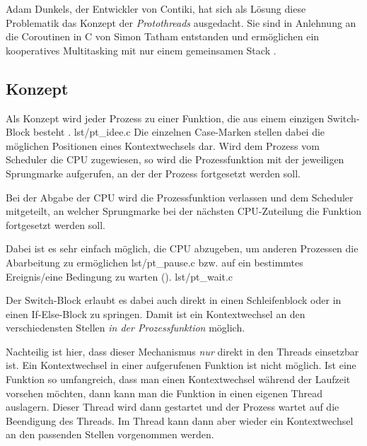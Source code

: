 	Adam Dunkels, der Entwickler von Contiki, hat sich als Lösung diese
	Problematik das Konzept der \emph{Protothreads} ausgedacht.  Sie sind in
	Anlehnung an die Coroutinen in C von Simon Tatham entstanden
	und ermöglichen ein kooperatives Multitasking mit nur einem
	gemeinsamen Stack
	\autocite{Contiki:UnderTheHood}.


\subsection{Konzept}
	Als Konzept wird jeder Prozess zu einer Funktion, die aus einem
	einzigen Switch-Block besteht .
			{lst/pt_idee.c}
	Die einzelnen Case-Marken stellen dabei die möglichen Positionen
	eines Kontextwechsels dar.  Wird dem Prozess vom Scheduler die CPU
	zugewiesen, so wird die Prozessfunktion mit der jeweiligen Sprungmarke
	aufgerufen, an der der Prozess fortgesetzt werden soll.

	Bei der Abgabe der CPU wird die Prozessfunktion verlassen und dem
	Scheduler mitgeteilt, an welcher Sprungmarke bei der nächsten
	CPU-Zuteilung die Funktion fortgesetzt werden soll.

	Dabei ist es sehr einfach möglich, die CPU abzugeben, um anderen
	Prozessen die Abarbeitung zu ermöglichen 
			{lst/pt_pause.c}
	bzw. auf ein bestimmtes Ereignis/eine Bedingung zu warten
	().
			{lst/pt_wait.c}

	Der Switch-Block erlaubt es dabei auch direkt in einen
	Schleifenblock oder in einen If-Else-Block zu springen.
	\autocite{dunkels06protothreads,duff:loops}
	Damit ist ein Kontextwechsel
	an den verschiedensten Stellen \emph{in der Prozessfunktion} möglich.

	Nachteilig ist hier, dass dieser Mechanismus \emph{nur} direkt in den
	Threads einsetzbar ist.  Ein Kontextwechsel in einer
	aufgerufenen Funktion ist nicht möglich.  Ist eine Funktion so
	umfangreich, dass man einen Kontextwechsel während der Laufzeit
	vorsehen möchten, dann kann man die Funktion in einen eigenen Thread
	auslagern.  Dieser Thread wird dann gestartet und der Prozess wartet
	auf die Beendigung des Threads.  Im Thread kann dann aber wieder ein
	Kontextwechsel an den passenden Stellen vorgenommen werden.


